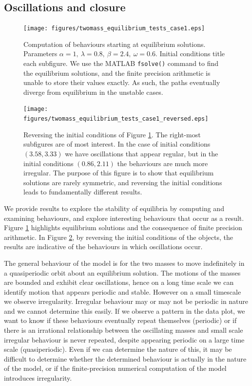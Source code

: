 \subsection{Oscillations and closure}

\begin{figure}[h!]
    \centering
    \texttt{[image: figures/twomass\_equilibrium\_tests\_case1.eps]}
    \caption{
        Computation of behaviours starting at equilibrium solutions.
        Parameters \(\alpha=1,~\lambda=0.8,~\beta=2.4,~\omega=0.6\).
        Initial conditions title each subfigure.
        We use the MATLAB \texttt{fsolve()} command to find the equilibrium solutions,
        and the finite precision arithmetic is unable to store their values exactly.
        As such, the paths eventually diverge from equilibrium in the unstable cases.
    }
    \label{fig:twomass_equilibria_timeseries}
\end{figure}

\begin{figure}[h!]
    \centering
    \texttt{[image: figures/twomass\_equilibrium\_tests\_case1\_reversed.eps]}
    \caption{
        Reversing the initial conditions of Figure \ref{fig:twomass_equilibria_timeseries}.
        The right-most subfigures are of most interest.
        In the case of initial conditions \((3.58,3.33)\) we have oscillations that appear regular,
        but in the initial conditions \((0.86,2.11)\) the behaviours are much more irregular.
        The purpose of this figure is to show that equilibrium solutions are rarely symmetric,
        and reversing the initial conditions leads to fundamentally different results.
    }
    \label{fig:twomass_equilibria_timeseries_2}
\end{figure}

We provide results to explore the stability of equilibria by computing and examining behaviours, and explore interesting behaviours that occur as a result.
Figure \ref{fig:twomass_equilibria_timeseries} highlights equilibrium solutions and the consequence of finite precision arithmetic.
In Figure \ref{fig:twomass_equilibria_timeseries_2}, by reversing the initial conditions of the objects,
the results are indicative of the behaviours in which oscillations occur.

The general behaviour of the model is for the two masses to move indefinitely in a quasiperiodic orbit about an equilibrium solution.
The motions of the masses are bounded and exhibit clear oscillations,
hence on a long time scale we can identify motion that appears periodic and stable.
However on a small timescale we observe irregularity.
Irregular behaviour may or may not be periodic in nature and we cannot determine this easily.
If we observe a pattern in the data plot, %
we want to know if these behaviours eventually repeat themselves (periodic) or if there is an irrational relationship between the oscillating masses and small scale irregular behaviour is never repeated, despite appearing periodic on a large time scale (quasiperiodic).
Even if we can determine the nature of this,
it may be difficult to determine whether the determined behaviour is actually in the nature of the model,
or if the finite-precision numerical computation of the model introduces irregularity.

